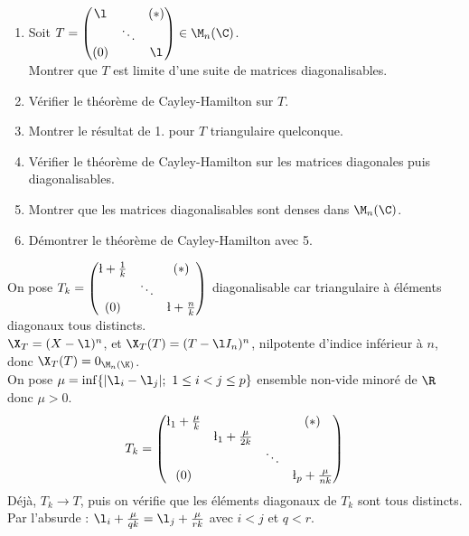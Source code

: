 \documentclass[11pt]{article}
\begin{document}
\begin{exercice}{}{}
    \begin{enumerate}
        \item Soit $T=\begin{pmatrix}\l & & (*) \\ & \ddots & \\ (0) & & \l\end{pmatrix}\in\M_n(\C)$.\\
        Montrer que $T$ est limite d'une suite de matrices diagonalisables.
        \item Vérifier le théorème de Cayley-Hamilton sur $T$.
        \item Montrer le résultat de 1. pour $T$ triangulaire quelconque.
        \item Vérifier le théorème de Cayley-Hamilton sur les matrices diagonales puis diagonalisables.
        \item Montrer que les matrices diagonalisables sont denses dans $\M_n(\C)$.
        \item Démontrer le théorème de Cayley-Hamilton avec 5.
    \end{enumerate}
    \tcblower
     On pose $T_k=\begin{pmatrix}\l+\frac{1}{k}&&(*)\\&\ddots&\\(0)&&\l+\frac{n}{k}\end{pmatrix}$ diagonalisable car triangulaire à éléments diagonaux tous distincts.\\
     $\X_T=(X-\l)^n$, et $\X_T(T)=(T-\l I_n)^n$, nilpotente d'indice inférieur à $n$, donc $\X_T(T)=0_{\M_n(\K)}$.\\
     On pose $\mu=\inf\{|\l_i - \l_j|; ~ 1 \leq i < j \leq p\}$ ensemble non-vide minoré de $\R$ donc $\mu>0$.
    \begin{equation*}
        T_k = \begin{pmatrix}\l_1 + \frac{\mu}{k} & & & (*) \\ & \l_1 + \frac{\mu}{2k} & & \\ & & \ddots & \\ (0) & & & \l_p + \frac{\mu}{nk}\end{pmatrix}
    \end{equation*}
    Déjà, $T_k\to T$, puis on vérifie que les éléments diagonaux de $T_k$ sont tous distincts.\\
    Par l'absurde : $\l_i + \frac{\mu}{qk} = \l_j + \frac{\mu}{rk}$ avec $i<j$ et $q<r$.\\

\end{exercice}
\end{document}
